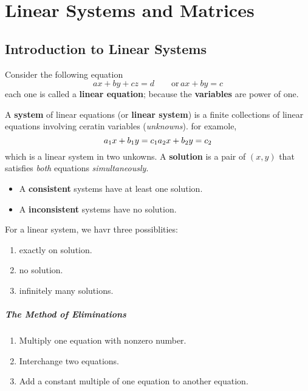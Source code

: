 \chapter{Linear Systems and Matrices} %
\label{cha:Linear Systems and Matrices}
    \section{Introduction to Linear Systems}
        Consider the following equation 
        \[ ax + by  +cz = d \qquad \text{or}\, ax + by = c \]
        each one is called a \textbf{linear equation}; because the \textbf{variables} are power of one.

        \bulletpar A \textbf{system} of linear equations (or \textbf{linear system}) is a finite collections of linear equations involving ceratin variables 
        (\textit{unknowns}). for examole, \[ a_1 x + b_1 y = c_1 \\ a_2 x + b_2 y = c_2\] which is a linear system in two unkowns.
        A \textbf{solution} is a pair of $(x, y)$ that satisfies \textit{both} equations \textit{simultaneously}.

        \begin{itemize}
            \item A \textbf{consistent} systems have at least one solution.
            \item A \textbf{inconsistent} systems have no solution.
        \end{itemize}
        
        \noindent
        For a linear system, we havr three possiblities:
        \begin{enumerate}
            \item exactly on solution.
            \item no solution.
            \item infinitely many solutions.
        \end{enumerate}

        \paragraph{The Method of Eliminations}
            \begin{enumerate}
                \item Multiply one equation with nonzero number.
                \item Interchange two equations.
                \item Add a constant multiple of one equation to another equation.
            \end{enumerate}

